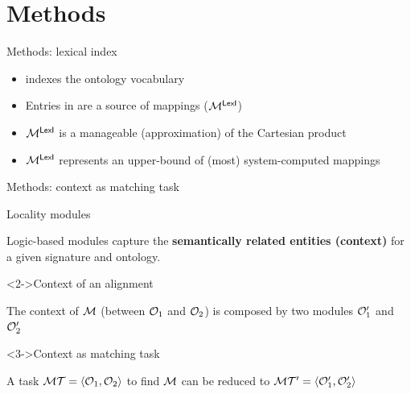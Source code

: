 \documentclass[t]{beamer}
\begin{document}
\section{Methods}





\begin{frame}{Methods: lexical index \lex}
	
	\begin{itemize}
	  \item \lex indexes the ontology vocabulary
	  \item Entries in \lex are a source of mappings (\ie $\mathcal{M}^{\textsf{LexI}}$)
	  \item<2-> $\mathcal{M}^{\textsf{LexI}}$ is a manageable (approximation) of the Cartesian product
	  \item<2-> $\mathcal{M}^{\textsf{LexI}}$ represents an upper-bound of (most) system-computed
	  mappings
	\end{itemize}
	
	
	
	
	
	
\end{frame}




\begin{frame}{Methods: context as matching task}
	
	\begin{block}{Locality modules}
	
	Logic-based modules capture the \textbf{semantically related entities (context)}
	for a given signature and ontology.
	\end{block}
	
	\begin{block}<2->{Context of an alignment}
	
	The context of $\mathcal{M}$ (between $\mathcal{O}_1$ and $\mathcal{O}_2$) is composed by two modules
	$\mathcal{O}_1'$ and $\mathcal{O}_2'$
	
	
	\end{block}
	
	
	
	\begin{block}<3->{Context as matching task}
	
	
	A task $\mathcal{M}\mathcal{T}=\langle \mathcal{O}_1, \mathcal{O}_2 \rangle$ to find $\mathcal{M}$ can be reduced to
	$\mathcal{M}\mathcal{T}'=\langle \mathcal{O}_1', \mathcal{O}_2' \rangle$
	
	\end{block}
	
	
	
  	
\end{frame}
\end{document}
